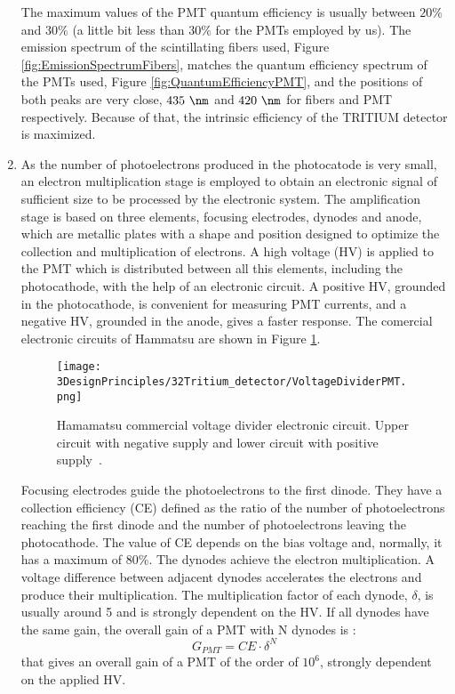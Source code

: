 \begin{enumerate}
The maximum values of the PMT quantum efficiency is usually between $20\%$ and $30\%$ \cite{Knoll} (a little bit less than $30\%$ for the PMTs employed by us). The emission spectrum of the scintillating fibers used, Figure \ref{fig:EmissionSpectrumFibers}, matches the quantum efficiency spectrum of the PMTs used, Figure \ref{fig:QuantumEfficiencyPMT}, and the positions of both peaks are very close, $435~\nm$ and $420~\nm$ for fibers and PMT respectively. Because of that, the intrinsic efficiency of the TRITIUM detector is maximized.

\item{} As the number of photoelectrons produced in the photocatode is very small, an electron multiplication stage is employed to obtain an electronic signal of sufficient size to be processed by the electronic system. The amplification stage is based on three elements, focusing electrodes, dynodes and anode, which are metallic plates with a shape and position designed to optimize the collection and multiplication of electrons. A high voltage (HV) is applied to the PMT which is distributed between all this elements, including the photocathode, with the help of an electronic circuit. A positive HV, grounded in the photocathode, is convenient for measuring PMT currents, and a negative HV, grounded in the anode, gives a faster response. The comercial electronic circuits of Hammatsu are shown in Figure \ref{fig:VoltageDividerCircuit}.

\begin{figure}[h]
\centering
\texttt{[image: 3DesignPrinciples/32Tritium\_detector/VoltageDividerPMT.png]}
\caption{Hamamatsu commercial voltage divider electronic circuit. Upper circuit with negative supply and lower circuit with positive supply\label{fig:VoltageDividerCircuit}~\cite{DataSheetPMTs}.}
\end{figure}


Focusing electrodes guide the photoelectrons to the first dinode. They have a collection efficiency (CE) defined as the ratio of the number of photoelectrons reaching the first dinode and the number of photoelectrons leaving the photocathode. The value of CE depends on the bias voltage and, normally, it has a maximum of $80\%$. The dynodes achieve the electron multiplication. A voltage difference between adjacent dynodes accelerates the electrons and produce their multiplication. The multiplication factor of each dynode, $\delta$, is usually around 5 and is strongly dependent on the HV. If all dynodes have the same gain, the overall gain of a PMT with N dynodes is \cite{Knoll}:
\begin{equation}
G_{PMT} = CE\cdot{} \delta^N
\label{eq:PMTGain}
\end{equation}
that gives an overall gain of a PMT of the order of $10^6$, strongly dependent on the applied HV.


\end{enumerate}
